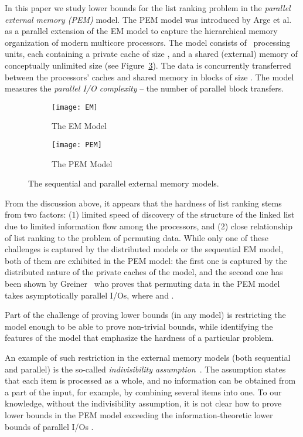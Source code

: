 \documentclass[envcountsame]{llncs}
\def\bOm#1{\printmath{\Omega \left(#1\right)}}
\begin{document}
In this paper we study lower bounds for the list ranking problem in the {\em parallel external memory (PEM)} model. 
The PEM model was introduced by Arge et al.~\cite{2008ArgeEtAlFundamentalPEM} as a parallel extension of the EM model to capture the hierarchical memory organization of modern multicore processors. 
The model consists of~ processing units, each containing a private cache of size , and a shared (external) memory of conceptually unlimited size (see Figure~\ref{figurePEMmodel}). 
The data is concurrently transferred between the processors' caches and shared memory in blocks of size . 
The model measures the {\em parallel I/O complexity} -- the number of parallel block transfers. 
\begin{figure}[tb]
\centering
\begin{subfigure}{.3\textwidth}
\texttt{[image: EM]}
\caption{The EM Model}
\label{figureEMmodel}
\end{subfigure}
\begin{subfigure}{.69\textwidth}
\texttt{[image: PEM]}
\caption{The PEM Model}
\label{figurePEMmodel}
\end{subfigure}
\caption{The sequential and parallel external memory models.}
\end{figure}
From the discussion above, it appears that the hardness of list ranking stems from two factors: (1) limited speed of discovery of the structure of the linked list due to limited information flow among the processors,
and (2) close relationship of list ranking to the problem of permuting data. 
While only one of these challenges is captured by the distributed models or the sequential EM model, both of them are exhibited in the PEM model: the first one is captured by the distributed nature of the private caches of the model, and the second one has been shown by Greiner~\cite{2012ThesisGero} who proves that permuting data in the PEM model takes asymptotically  parallel I/Os, where  and .

Part of the challenge of proving lower bounds (in any model) is restricting the model enough to be able to prove non-trivial bounds, while identifying the features of the model that emphasize the hardness of a particular problem. 

An example of such restriction in the external memory models (both sequential and parallel) is the so-called {\em indivisibility assumption}~\cite{1988AggarwalVitterEM}. 
The assumption states that each item is processed as a whole, and no information can be obtained from a part of the input, for example, by combining  several items into one. 
To our knowledge, without the indivisibility assumption, it is not clear how to prove lower bounds in the PEM model exceeding the information-theoretic lower bounds of \bOm{\log P} parallel I/Os \cite{1990KarpRamachandranPRAMListRankLB,2008ArgeEtAlFundamentalPEM}.  
\end{document}
